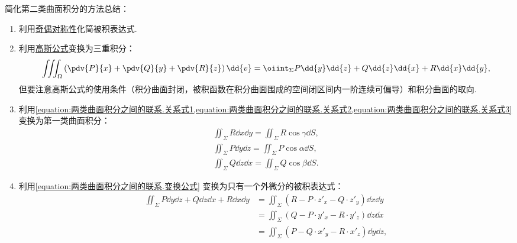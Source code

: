 简化第二类曲面积分的方法总结：\begin{enumerate}
	\item 利用\hyperref[section:线积分与面积分.利用对称性简化第二类曲面积分的计算]{奇偶对称性}化简被积表达式.

	\item 利用\hyperref[equation:线积分与面积分.高斯公式]{高斯公式}变换为三重积分：\begin{equation*}
		\iiint_\Omega \left(\pdv{P}{x}+\pdv{Q}{y}+\pdv{R}{z}\right)\dd{v}
		= \oiint_\Sigma P\dd{y}\dd{z}+Q\dd{z}\dd{x}+R\dd{x}\dd{y},
	\end{equation*}
	但要注意高斯公式的使用条件（积分曲面封闭，被积函数在积分曲面围成的空间闭区间内一阶连续可偏导）和积分曲面的取向.

	\item 利用\cref{equation:两类曲面积分之间的联系.关系式1,equation:两类曲面积分之间的联系.关系式2,equation:两类曲面积分之间的联系.关系式3}
	变换为第一类曲面积分：\begin{gather*}
		\iint_\Sigma R \dd{x}\dd{y}
		= \iint_\Sigma R \cos\gamma \dd{S}, \\
		\iint_\Sigma P \dd{y}\dd{z}
		= \iint_\Sigma P \cos\alpha \dd{S}, \\
		\iint_\Sigma Q \dd{z}\dd{x}
		= \iint_\Sigma Q \cos\beta \dd{S}.
	\end{gather*}

	\item 利用\cref{equation:两类曲面积分之间的联系.变换公式}
	变换为只有一个外微分的被积表达式：\begin{align*}
		\iint_\Sigma P\dd{y}\dd{z}+Q\dd{z}\dd{x}+R\dd{x}\dd{y}
		&= \iint_\Sigma \left(R - P \cdot z'_x - Q \cdot z'_y\right)\dd{x}\dd{y} \\
		&= \iint_\Sigma \left(Q - P \cdot y'_x - R \cdot y'_z\right)\dd{z}\dd{x} \\
		&= \iint_\Sigma \left(P - Q \cdot x'_y - R \cdot x'_z\right)\dd{y}\dd{z},
	\end{align*}
\end{enumerate}
